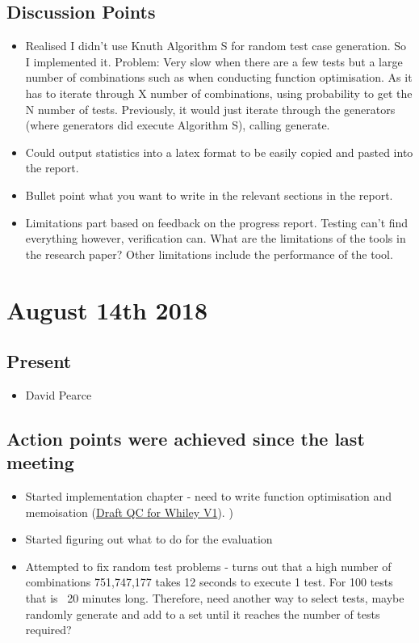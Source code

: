 \documentclass[]{article}
\begin{document}
\subsection{Discussion Points}
\begin{itemize}
	\item Realised I didn't use Knuth Algorithm S for random test case generation. So I implemented it. Problem: Very slow when there are a few tests but a large number of combinations such as when conducting function optimisation. As it has to iterate through X number of combinations, using probability to get the N number of tests. Previously, it would just iterate through the generators (where generators did execute Algorithm S), calling generate.
	\item Could output statistics into a latex format to be easily copied and pasted into the report.
	\item Bullet point what you want to write in the relevant sections in the report.
	\item Limitations part based on feedback on the progress report. Testing can't find everything however, verification can. What are the limitations of the tools in the research paper? Other limitations include the performance of the tool.
\end{itemize}


\section{August 14th 2018}
\subsection{Present}
\begin{itemize}
	\item David Pearce
\end{itemize}

\subsection{Action points were achieved since the last meeting}
\begin{itemize}
	\item Started implementation chapter - need to write function optimisation and memoisation (\href{https://gitlab.ecs.vuw.ac.nz/project489-2018/chinjani/quickcheck-for-whiley-final-report/blob/master/Draft%20V1%20QuickCheck%20for%20Whiley%20-%20Janice%20Chin.pdf}{Draft QC for Whiley V1}). )
	\item Started figuring out what to do for the evaluation
	\item Attempted to fix random test problems - turns out that a high number of combinations 751,747,177 takes 12 seconds to execute 1 test. For 100 tests that is ~20 minutes long. Therefore, need another way to select tests, maybe randomly generate and add to a set until it reaches the number of tests required?
\end{itemize}
\end{document}
